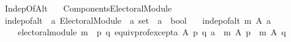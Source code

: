 %
\begin{isabellebody}%
%
%
\isadelimtheory
%
\endisadelimtheory
%
\isatagtheory
{}\isamarkupfalse%
\ Indep{\isacharunderscore}{\kern0pt}Of{\isacharunderscore}{\kern0pt}Alt\isanewline
\ \ \ {\isachardoublequoteopen}{\isachardot}{\kern0pt}{\isachardot}{\kern0pt}{\isacharslash}{\kern0pt}Components{\isacharslash}{\kern0pt}Electoral{\isacharunderscore}{\kern0pt}Module{\isachardoublequoteclose}\isanewline
\isanewline
{}%
\endisatagtheory
{\isafoldtheory}%
%
\isadelimtheory
\isanewline
%
\endisadelimtheory
\isanewline
\isanewline
{}\isamarkupfalse%
\ indep{\isacharunderscore}{\kern0pt}of{\isacharunderscore}{\kern0pt}alt\ {\isacharcolon}{\kern0pt}{\isacharcolon}{\kern0pt}\ {\isachardoublequoteopen}{\isacharprime}{\kern0pt}a\ Electoral{\isacharunderscore}{\kern0pt}Module\ {\isasymRightarrow}\ {\isacharprime}{\kern0pt}a\ set\ {\isasymRightarrow}\ {\isacharprime}{\kern0pt}a\ {\isasymRightarrow}\ bool{\isachardoublequoteclose}\ \isanewline
\ \ {\isachardoublequoteopen}indep{\isacharunderscore}{\kern0pt}of{\isacharunderscore}{\kern0pt}alt\ m\ A\ a\ {\isasymequiv}\isanewline
\ \ \ \ electoral{\isacharunderscore}{\kern0pt}module\ m\ {\isasymand}\ {\isacharparenleft}{\kern0pt}{\isasymforall}p\ q{\isachardot}{\kern0pt}\ equiv{\isacharunderscore}{\kern0pt}prof{\isacharunderscore}{\kern0pt}except{\isacharunderscore}{\kern0pt}a\ A\ p\ q\ a\ {\isasymlongrightarrow}\ m\ A\ p\ {\isacharequal}{\kern0pt}\ m\ A\ q{\isacharparenright}{\kern0pt}{\isachardoublequoteclose}\isanewline
%
\isadelimtheory
\isanewline
%
\endisadelimtheory
%
\isatagtheory
{}\isamarkupfalse%
%
\endisatagtheory
{\isafoldtheory}%
%
\isadelimtheory
%
\endisadelimtheory
%
\end{isabellebody}%
\endinput
